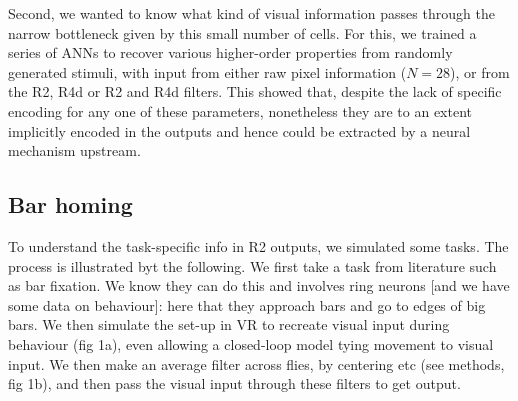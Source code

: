 Second, we wanted to know what kind of visual information passes through the narrow bottleneck given by this small number of cells.
For this, we trained a series of \acp{ANN} to recover various higher-order properties from randomly generated stimuli, with input from either raw pixel information ($N=28$), or from the R2, R4d or R2 and R4d filters.
This showed that, despite the lack of specific encoding for any one of these parameters, nonetheless they are to an extent implicitly encoded in the outputs and hence could be extracted by a neural mechanism upstream.



\subsection{Bar homing}


To understand the task-specific info in R2 outputs, we simulated some tasks. The process is illustrated byt the following. We first take a task from literature 
such as bar fixation. We know they can do this and involves ring neurons [and we have some data on behaviour]: here that they approach bars and go to edges of big bars.  
We then simulate the set-up in VR to recreate visual input during behaviour (fig 1a), even allowing a closed-loop model tying movement to visual input. 
We then make an average filter across flies, by centering etc (see methods, fig 1b), and then pass the visual input through these filters to get output. 

